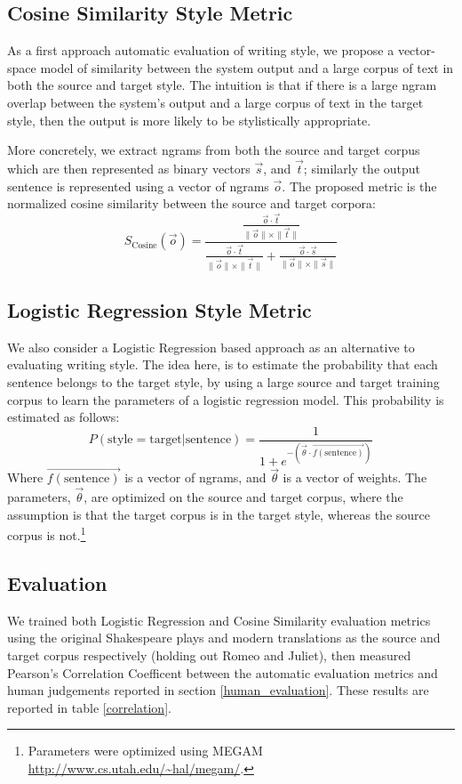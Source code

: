 \documentclass[10pt,a5paper,twoside]{article}
\begin{document}
\subsection{Cosine Similarity Style Metric}
As a first approach automatic evaluation of writing style, we propose a vector-space model of similarity between the system
output and a large corpus of text in both the source and target style.  The intuition is that if there is a large ngram
overlap between the system's output and a large corpus of text in the target style, then the output is more likely to be
stylistically appropriate.

More concretely, we extract ngrams from both the source and target corpus which are then represented as binary
vectors $\vec{s}$, and $\vec{t}$; similarly the output sentence is represented using a vector of
ngrams $\vec{o}$.  
The proposed metric is the normalized cosine similarity between the source and target corpora:
\[
S_{\text{Cosine}}(\vec{o}) = \frac{\frac{\vec{o} \cdot \vec{t}}{\|\vec{o}\| \times \|\vec{t}\|}}{\frac{\vec{o} \cdot \vec{t}}{\|\vec{o}\| \times \|\vec{t}\|} + \frac{\vec{o} \cdot \vec{s}}{\|\vec{o}\| \times \|\vec{s}\|}}
\]
 

\subsection{Logistic Regression Style Metric}
We also consider a Logistic Regression based approach as an alternative to evaluating writing style.  The idea here, is to estimate the probability that each
sentence belongs to the target style, by using a large source and target training corpus to learn the parameters of a logistic regression model.
This probability is estimated as follows:
\[
P(\text{style} = \text{target}|\text{sentence}) = \frac{1}{1 + e^{-\left( \vec{\theta} \cdot \vec{f(\text{sentence})} \right)}}
\]
Where $\vec{f(\text{sentence})}$ is a vector of ngrams, and $\vec{\theta}$ is a vector of weights.  
The parameters, $\vec{\theta}$, are optimized on the source and target corpus, where the assumption is that the target corpus
is in the target style, whereas the source corpus is not.\footnote{
  Parameters were optimized using MEGAM \url{http://www.cs.utah.edu/~hal/megam/}.
}

\subsection{Evaluation}
We trained both Logistic Regression and Cosine Similarity evaluation metrics using the original Shakespeare plays and modern translations as
the source and target corpus respectively (holding out Romeo and Juliet), then measured Pearson's Correlation Coefficent between the automatic
evaluation metrics and human judgements reported in section \ref{human_evaluation}.  These results are reported in table \ref{correlation}.
\end{document}
